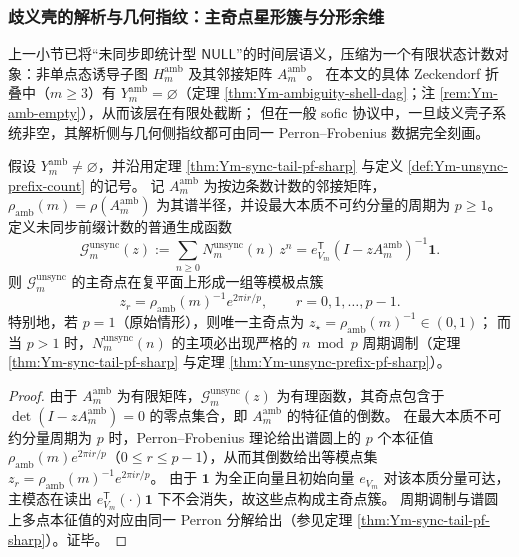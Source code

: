 \subsubsection{歧义壳的解析与几何指纹：主奇点星形簇与分形余维}\label{subsubsec:Ym-ambiguity-analytic-geometry}
上一小节已将“未同步即统计型 \(\mathsf{NULL}\)”的时间层语义，压缩为一个有限状态计数对象：非单点态诱导子图 \(H_m^{\mathrm{amb}}\) 及其邻接矩阵 \(A_m^{\mathrm{amb}}\)。
在本文的具体 Zeckendorf 折叠中（\(m\ge 3\)）有 \(Y_m^{\mathrm{amb}}=\varnothing\)（定理 \ref{thm:Ym-ambiguity-shell-dag}；注 \ref{rem:Ym-amb-empty}），从而该层在有限处截断；
但在一般 sofic 协议中，一旦歧义壳子系统非空，其解析侧与几何侧指纹都可由同一 Perron--Frobenius 数据完全刻画。

\begin{corollary}\label{cor:Ym-unsync-star-pole-cluster}
假设 \(Y_m^{\mathrm{amb}}\neq\varnothing\)，并沿用定理 \ref{thm:Ym-sync-tail-pf-sharp} 与定义 \ref{def:Ym-unsync-prefix-count} 的记号。
记 \(A_m^{\mathrm{amb}}\) 为按边条数计数的邻接矩阵，\(\rho_{\mathrm{amb}}(m)=\rho(A_m^{\mathrm{amb}})\) 为其谱半径，并设最大本质不可约分量的周期为 \(p\ge 1\)。
定义未同步前缀计数的普通生成函数
\[
\mathcal{G}_m^{\mathrm{unsync}}(z)
:=\sum_{n\ge 0}N_m^{\mathrm{unsync}}(n)\,z^n
=e_{V_m}^{\mathsf T}(I-zA_m^{\mathrm{amb}})^{-1}\mathbf 1.
\]
则 \(\mathcal{G}_m^{\mathrm{unsync}}\) 的主奇点在复平面上形成一组等模极点簇
\[
z_r=\rho_{\mathrm{amb}}(m)^{-1}e^{2\pi i r/p},\qquad r=0,1,\dots,p-1.
\]
特别地，若 \(p=1\)（原始情形），则唯一主奇点为 \(z_\star=\rho_{\mathrm{amb}}(m)^{-1}\in(0,1)\)；
而当 \(p>1\) 时，\(N_m^{\mathrm{unsync}}(n)\) 的主项必出现严格的 \(n\bmod p\) 周期调制（定理 \ref{thm:Ym-sync-tail-pf-sharp} 与定理 \ref{thm:Ym-unsync-prefix-pf-sharp}）。
\end{corollary}
\begin{proof}
由于 \(A_m^{\mathrm{amb}}\) 为有限矩阵，\(\mathcal{G}_m^{\mathrm{unsync}}(z)\) 为有理函数，其奇点包含于 \(\det(I-zA_m^{\mathrm{amb}})=0\) 的零点集合，即 \(A_m^{\mathrm{amb}}\) 的特征值的倒数。
在最大本质不可约分量周期为 \(p\) 时，Perron--Frobenius 理论给出谱圆上的 \(p\) 个本征值
\(
\rho_{\mathrm{amb}}(m)e^{2\pi i r/p}
\)（\(0\le r\le p-1\)），从而其倒数给出等模点集
\(
z_r=\rho_{\mathrm{amb}}(m)^{-1}e^{2\pi i r/p}
\)。
由于 \(\mathbf 1\) 为全正向量且初始向量 \(e_{V_m}\) 对该本质分量可达，主模态在读出 \(e_{V_m}^{\mathsf T}(\cdot)\mathbf 1\) 下不会消失，故这些点构成主奇点簇。
周期调制与谱圆上多点本征值的对应由同一 Perron 分解给出（参见定理 \ref{thm:Ym-sync-tail-pf-sharp}）。证毕。
\end{proof}

